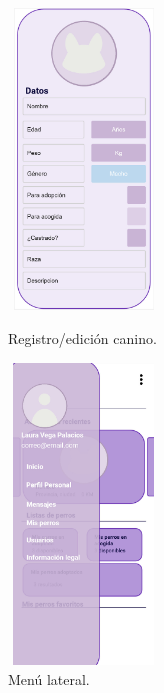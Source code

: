 \documentclass[a4paper, 12pt]{article}
\begin{document}
\begin{figure}[H]
   	\begin{minipage}{0.48\textwidth}
		\begin{center}
			{\includegraphics[height=8cm, width=4cm]{design/RegisterDog.jpg}\par}
			\caption{Registro/edición canino.}
			\medskip
		\end{center}  
	\end{minipage}\hfill
   	\begin{minipage}{0.48\textwidth}
		\begin{center}
			{\includegraphics[height=8cm, width=4cm]{design/SideMenu.jpg}\par}
			\caption{Menú lateral.}
			\medskip
		\end{center}  
	\end{minipage}\hfill
\end{figure}
\end{document}
